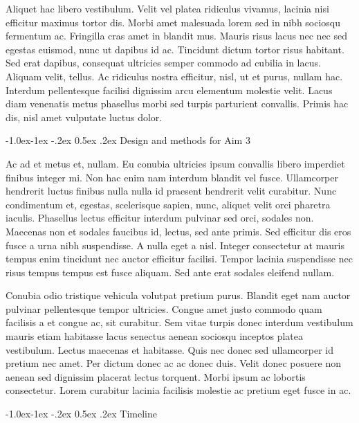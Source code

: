 \documentclass[11pt,]{article}
\makeatletter
\renewcommand\subsubsection{
  \@startsection{subsubsection}{3}{\z@}
    {-1.0ex\@plus -1ex \@minus -.2ex}%
    {0.5ex \@plus .2ex}%
    {\normalfont\normalsize\bf}} %
\makeatother
\begin{document}
Aliquet hac libero vestibulum. Velit vel platea ridiculus vivamus,
lacinia nisi efficitur maximus tortor dis. Morbi amet malesuada lorem
sed in nibh sociosqu fermentum ac. Fringilla cras amet in blandit mus.
Mauris risus lacus nec nec sed egestas euismod, nunc ut dapibus id ac.
Tincidunt dictum tortor risus habitant. Sed erat dapibus, consequat
ultricies semper commodo ad cubilia in lacus. Aliquam velit, tellus. Ac
ridiculus nostra efficitur, nisl, ut et purus, nullam hac. Interdum
pellentesque facilisi dignissim arcu elementum molestie velit. Lacus
diam venenatis metus phasellus morbi sed turpis parturient convallis.
Primis hac dis, nisl amet vulputate luctus dolor.

\hypertarget{design-and-methods-for-aim-3}{%
\subsubsection{Design and methods for Aim
3}\label{design-and-methods-for-aim-3}}

Ac ad et metus et, nullam. Eu conubia ultricies ipsum convallis libero
imperdiet finibus integer mi. Non hac enim nam interdum blandit vel
fusce. Ullamcorper hendrerit luctus finibus nulla nulla id praesent
hendrerit velit curabitur. Nunc condimentum et, egestas, scelerisque
sapien, nunc, aliquet velit orci pharetra iaculis. Phasellus lectus
efficitur interdum pulvinar sed orci, sodales non. Maecenas non et
sodales faucibus id, lectus, sed ante primis. Sed efficitur dis eros
fusce a urna nibh suspendisse. A nulla eget a nisl. Integer consectetur
at mauris tempus enim tincidunt nec auctor efficitur facilisi. Tempor
lacinia suspendisse nec risus tempus tempus est fusce aliquam. Sed ante
erat sodales eleifend nullam.

Conubia odio tristique vehicula volutpat pretium purus. Blandit eget nam
auctor pulvinar pellentesque tempor ultricies. Congue amet justo commodo
quam facilisis a et congue ac, sit curabitur. Sem vitae turpis donec
interdum vestibulum mauris etiam habitasse lacus senectus aenean
sociosqu inceptos platea vestibulum. Lectus maecenas et habitasse. Quis
nec donec sed ullamcorper id pretium nec amet. Per dictum donec ac ac
donec duis. Velit donec posuere non aenean sed dignissim placerat lectus
torquent. Morbi ipsum ac lobortis consectetur. Lorem curabitur lacinia
facilisis molestie ac pretium eget fusce in ac.

\hypertarget{timeline}{%
\subsubsection{Timeline}\label{timeline}}
\end{document}
